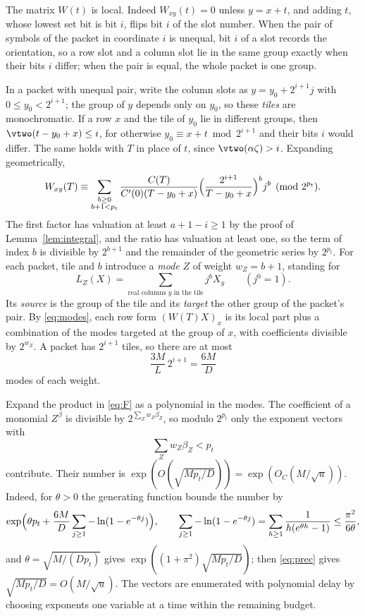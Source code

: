 The matrix $W(t)$ is local. Indeed $W_{xy}(t)=0$ unless $y=x+t$, and adding $t$,
whose lowest set bit is bit $i$, flips bit $i$ of the slot number. When the pair
of symbols of the packet in coordinate $i$ is unequal, bit $i$ of a slot
records the orientation, so a row slot and a column slot lie in the same group
exactly when their bits $i$ differ; when the pair is equal, the whole packet is
one group.

In a packet with unequal pair, write the column slots as $y=y_0+2^{i+1}j$ with
$0\le y_0<2^{i+1}$; the group of $y$ depends only on $y_0$, so these
\emph{tiles} are monochromatic. If a row $x$ and the tile of $y_0$ lie in
different groups, then $\vtwo(t-y_0+x)\le i$, for otherwise $y_0\equiv x+t\bmod
2^{i+1}$ and their bits $i$ would differ. The same holds with $T$ in place of $t$,
since $\vtwo(\alpha\zeta)>i$. Expanding geometrically,
\begin{equation}\label{eq:modes}
W_{xy}(T)\equiv\sum_{\substack{b\ge0\\ b+1<p_t}}
\frac{C(T)}{C'(0)(T-y_0+x)}\Bigl(\frac{2^{i+1}}{T-y_0+x}\Bigr)^bj^b
\pmod{2^{p_t}}.
\end{equation}
The first factor has valuation at least $a+1-i\ge1$ by the proof of
Lemma~\ref{lem:integral}, and the ratio has valuation at least one, so the term
of index $b$ is divisible by $2^{b+1}$ and the remainder of the geometric series
by $2^{p_t}$. For each packet, tile and $b$ introduce a \emph{mode} $Z$ of weight
$w_Z=b+1$, standing for
\[
L_Z(X)=\sum_{\text{real columns }y\text{ in the tile}}j^bX_y\qquad(j^0=1).
\]
Its \emph{source} is the group of the tile and its \emph{target} the other group
of the packet's pair. By \eqref{eq:modes}, each row form $(W(T)X)_x$ is its
local part plus a combination of the modes targeted at the group of $x$, with
coefficients divisible by $2^{w_Z}$. A packet has $2^{i+1}$ tiles, so there are at
most
\begin{equation}\label{eq:modecount}
\frac{3M}L\,2^{i+1}=\frac{6M}D
\end{equation}
modes of each weight.

Expand the product in \eqref{eq:F} as a polynomial in the modes. The coefficient
of a monomial $Z^\beta$ is divisible by $2^{\sum_Zw_Z\beta_Z}$, so modulo $2^{p_t}$
only the exponent vectors with
\begin{equation}\label{eq:budget}
\sum_Zw_Z\beta_Z<p_t
\end{equation}
contribute. Their number is $\exp(O(\sqrt{Mp_t/D}))=\exp(O_C(M/\sqrt u))$. Indeed,
for $\theta>0$ the generating function bounds the number by
\[
\exp\Bigl(\theta p_t+\frac{6M}D\sum_{j\ge1}-\ln(1-e^{-\theta j})\Bigr),\qquad
\sum_{j\ge1}-\ln(1-e^{-\theta j})=\sum_{h\ge1}\frac1{h(e^{\theta h}-1)}\le\frac{\pi^2}{6\theta},
\]
and $\theta=\sqrt{M/(Dp_t)}$ gives $\exp((1+\pi^2)\sqrt{Mp_t/D})$; then
\eqref{eq:prec} gives $\sqrt{Mp_t/D}=O(M/\sqrt u)$. The vectors are enumerated
with polynomial delay by choosing exponents one variable at a time within the
remaining budget.

